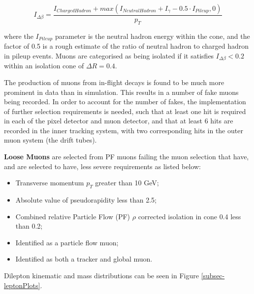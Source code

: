 \begin{equation}
I_{\Delta \beta} = \frac{I_{ChargedHadron} + max\left(I_{NeutralHadron} + I_{\gamma} - 0.5 \cdot I_{Pileup}, 0 \right)}{p_T}
\end{equation}

where the $I_{Pileup}$ parameter is the neutral hadron energy within the cone, and the factor of 0.5 is a rough estimate of the ratio of neutral hadron to charged hadron in pileup events. Muons are categorised as being isolated if it satisfies $I_{\Delta \beta} < 0.2$ within an isolation cone of $\Delta R = 0.4$. 

The production of muons from in-flight decays is found to be much more prominent in data than in simulation. This results in a number of fake muons being recorded. In order to account for the number of fakes, the implementation of further selection requirements is needed, such that at least one hit is required in each of the pixel detector and muon detector, and that at least 6 hits are recorded in the inner tracking system, with two corresponding hits in the outer muon system (the drift tubes).  

\textbf{Loose Muons} are selected from PF muons failing the muon selection that have, and are selected to have, less severe requirements as listed below:

\begin{itemize}
	\item Transverse momentum $p_T$ greater than 10 GeV;
	\item Absolute value of pseudorapidity less than 2.5;
	\item Combined relative Particle Flow (PF) $\rho$ corrected isolation in cone 0.4 less than 0.2;
	\item Identified as a particle flow muon;
	\item Identified as both a tracker and global muon.
\end{itemize}

Dilepton kinematic and mass distributions can be seen in Figure \ref{subsec-leptonPlots}.

